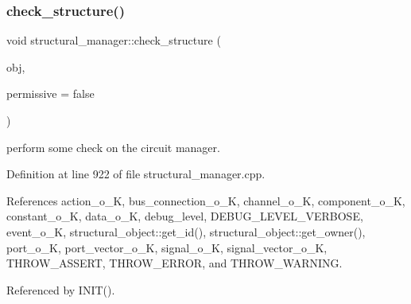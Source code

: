 \mbox{\label{classstructural__manager_af27b22e329e469a02e83f1066f5a3184}} 
\subsubsection{\texorpdfstring{check\+\_\+structure()}{check\_structure()}}
{\footnotesize\ttfamily void structural\+\_\+manager\+::check\+\_\+structure (\begin{DoxyParamCaption}\item[{\hyperlink{structural__objects_8hpp_a8ea5f8cc50ab8f4c31e2751074ff60b2}{structural\+\_\+object\+Ref}}]{obj,  }\item[{bool}]{permissive = {\ttfamily false} }\end{DoxyParamCaption})\hspace{0.3cm}{\ttfamily [private]}}



perform some check on the circuit manager. 



Definition at line 922 of file structural\+\_\+manager.\+cpp.



References action\+\_\+o\+\_\+K, bus\+\_\+connection\+\_\+o\+\_\+K, channel\+\_\+o\+\_\+K, component\+\_\+o\+\_\+K, constant\+\_\+o\+\_\+K, data\+\_\+o\+\_\+K, debug\+\_\+level, D\+E\+B\+U\+G\+\_\+\+L\+E\+V\+E\+L\+\_\+\+V\+E\+R\+B\+O\+SE, event\+\_\+o\+\_\+K, structural\+\_\+object\+::get\+\_\+id(), structural\+\_\+object\+::get\+\_\+owner(), port\+\_\+o\+\_\+K, port\+\_\+vector\+\_\+o\+\_\+K, signal\+\_\+o\+\_\+K, signal\+\_\+vector\+\_\+o\+\_\+K, T\+H\+R\+O\+W\+\_\+\+A\+S\+S\+E\+RT, T\+H\+R\+O\+W\+\_\+\+E\+R\+R\+OR, and T\+H\+R\+O\+W\+\_\+\+W\+A\+R\+N\+I\+NG.



Referenced by I\+N\+I\+T().

